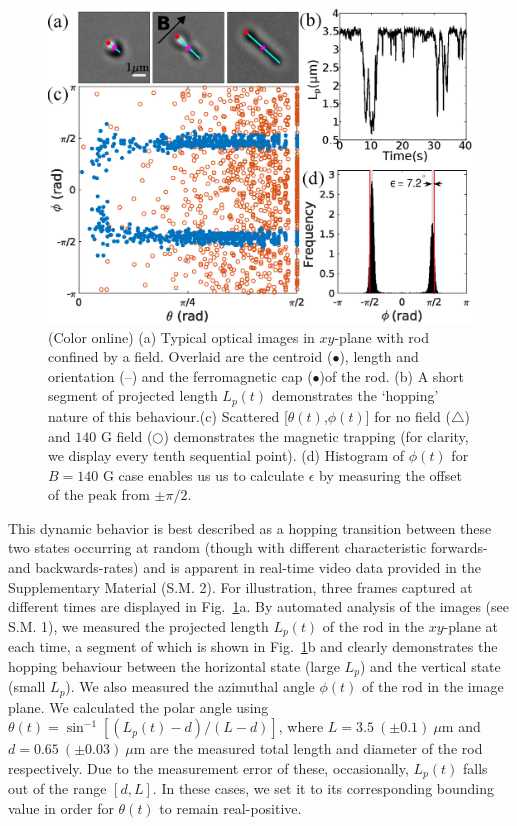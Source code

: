 \documentclass[aps,prl,reprint,twocolumn,superscriptaddress,showpacs]{revtex4-1}
\begin{document}
\begin{figure}[t]
\centering
\includegraphics[width=\columnwidth]{figs/Fig2updated.eps}
\caption{\footnotesize \label{fig2} (Color online) (a) Typical optical images in $xy$-plane with rod confined by a field. Overlaid are the centroid ({\color{magenta}$\bullet$}), length and orientation ({\color{cyan}--}) and the ferromagnetic cap ({\color{red}$\bullet$})of the rod. (b) A short segment of projected length $L_p(t)$ demonstrates the `hopping' nature of this behaviour.(c) Scattered [$\theta(t)$,$\phi(t)$] for no field ({\color{red}$\bigtriangleup$}) and $140$ G field ({\color{NavyBlue}$\bigcirc$}) demonstrates the magnetic trapping (for clarity, we display every tenth sequential point). (d) Histogram of $\phi(t)$ for $B=140$ G case enables us us to calculate $\epsilon$ by measuring the offset of the peak from $\pm \pi/2$.}
\end{figure}

This dynamic behavior is best described as a hopping transition between these two states occurring at random (though with different characteristic forwards- and backwards-rates) and is apparent in real-time video data provided in the Supplementary Material (S.M. 2). For illustration, three frames captured at different times are displayed in Fig.\ \ref{fig2}a. By automated analysis of the images (see S.M. 1), we measured the projected length $L_p(t)$ of the rod in the $xy$-plane at each time, a segment of which is shown in Fig.\ \ref{fig2}b and clearly demonstrates the hopping behaviour between the horizontal state (large $L_p$) and the vertical state (small $L_p$). We also measured the azimuthal angle $\phi(t)$ of the rod in the image plane. We calculated the polar angle using $\theta(t) = \sin^{-1}{[(L_p(t)- d)/(L - d)]}$, where $L=3.5\ (\pm0.1)\ \mu$m and $d=0.65\ (\pm0.03)\ \mu$m are the measured total length and diameter of the rod respectively. Due to the measurement error of these, occasionally, $L_p(t)$ falls out of the range $[d, L]$. In these cases, we set it to its corresponding bounding value in order for $\theta(t)$ to remain real-positive.
\end{document}
